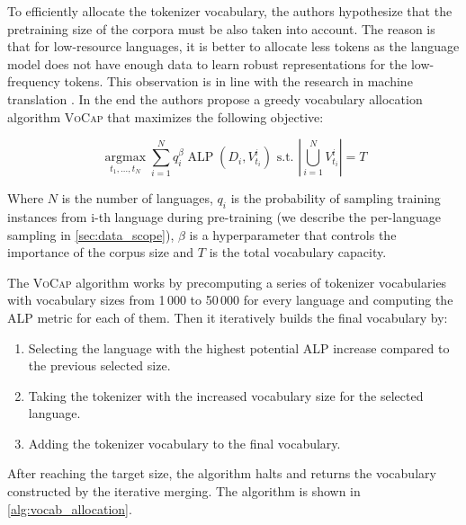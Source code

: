 To efficiently allocate the tokenizer vocabulary, the authors hypothesize that the pretraining size of the corpora must be also taken into account. The reason is that for low-resource languages, it is better to allocate less tokens as the language model does not have enough data to learn robust representations for the low-frequency tokens. This observation is in line with the research in machine translation \cite{gowda_finding_2020}.  In the end the authors propose a greedy vocabulary allocation algorithm \textsc{VoCap} that maximizes the following objective:

$$
\underset{t_1, \ldots, t_N}{\operatorname{argmax}} \sum_{i=1}^N q_i^\beta \operatorname{ALP}\left(D_i, V_{t_i}^i\right) \text { s.t. }\left|\bigcup_{i=1}^N V_{t_i}^i\right|=T
$$

Where $N$ is the number of languages, $q_i$ is the probability of sampling training instances from i-th language during pre-training (we describe the per-language sampling in \ref{sec:data_scope}), $\beta$ is a hyperparameter that controls the importance of the corpus size and $T$ is the total vocabulary capacity. 

The \textsc{VoCap} algorithm works by precomputing a series of tokenizer vocabularies with vocabulary sizes from 1\,000 to 50\,000 for every language and computing the ALP metric for each of them. Then it iteratively builds the final vocabulary by:

\begin{enumerate}
    \item Selecting the language with the highest potential ALP increase compared to the previous selected size.
    \item Taking the tokenizer with the increased vocabulary size for the selected language.
    \item Adding the tokenizer vocabulary to the final vocabulary.
\end{enumerate}

After reaching the target size, the algorithm halts and returns the vocabulary constructed by the iterative merging. The algorithm is shown in \autoref{alg:vocab_allocation}.


